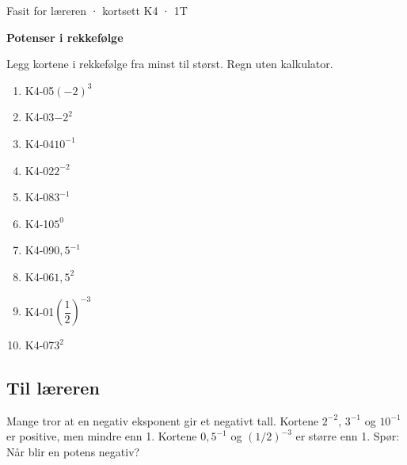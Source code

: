 \documentclass[11pt,a4paper]{article}
\begin{document}
\begin{minipage}[t]{0.8\linewidth}\vspace{0pt}
{\sffamily\small\color{dempet}Fasit for læreren · kortsett K4 · 1T}\par\vspace{0.25em}
{\fontsize{20}{24}\selectfont\bfseries Potenser i rekkefølge}\par\vspace{0.5em}
Legg kortene i rekkefølge fra minst til størst. Regn uten kalkulator.\par{}
\end{minipage}\hfill
\begin{minipage}[t]{0.15\linewidth}\vspace{0pt}\raggedleft
{}
\end{minipage}\par\vspace{0.8em}

\begin{enumerate}[leftmargin=1.6em, itemsep=0.45em]
\item \textsf{\small K4-05}\quad $(-2)^3$
\item \textsf{\small K4-03}\quad $-2^2$
\item \textsf{\small K4-04}\quad $10^{-1}$
\item \textsf{\small K4-02}\quad $2^{-2}$
\item \textsf{\small K4-08}\quad $3^{-1}$
\item \textsf{\small K4-10}\quad $5^0$
\item \textsf{\small K4-09}\quad $0{,}5^{-1}$
\item \textsf{\small K4-06}\quad $1{,}5^2$
\item \textsf{\small K4-01}\quad $\left(\dfrac{1}{2}\right)^{-3}$
\item \textsf{\small K4-07}\quad $3^2$
\end{enumerate}
\subsection*{Til læreren}
Mange tror at en negativ eksponent gir et negativt tall. Kortene $2^{-2}$, $3^{-1}$ og $10^{-1}$ er positive, men mindre enn 1. Kortene $0{,}5^{-1}$ og $(1/2)^{-3}$ er større enn 1. Spør: Når blir en potens negativ?
\end{document}
